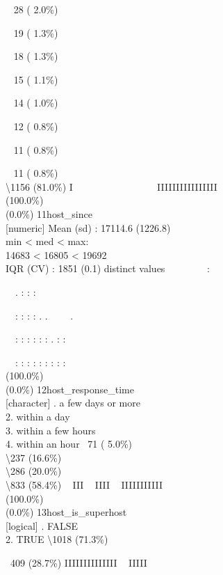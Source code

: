 \documentclass[
  journal,
]{IEEEtran}%
\begin{document}
\strut ~ 28 ( 2.0\%)\\
\strut ~ 19 ( 1.3\%)\\
\strut ~ 18 ( 1.3\%)\\
\strut ~ 15 ( 1.1\%)\\
\strut ~ 14 ( 1.0\%)\\
\strut ~ 12 ( 0.8\%)\\
\strut ~ 11 ( 0.8\%)\\
\strut ~ 11 ( 0.8\%)\\
\textbackslash1156 (81.0\%) \textbar{} \textbar I ~ ~ ~ ~ ~ ~ ~ ~ ~ ~
IIIIIIIIIIIIIIII \\
(100.0\%) \\
(0.0\%) \textbar{} \textbar{} 11\textbar host\_since\\
{[}numeric{]} \textbar Mean (sd) : 17114.6 (1226.8)\\
min \textless{} med \textless{} max:\\
14683 \textless{} 16805 \textless{} 19692\\
IQR (CV) : 1851 (0.1)  distinct values \textbar{}
\textbar~~~~~~~~:\\
\strut ~~. : : :\\
\strut ~~: : : : . . ~~~~.\\
\strut ~~: : : : : : . : :\\
\strut ~~: : : : : : : : : \\
(100.0\%) \\
(0.0\%) \textbar{} \textbar{} 12\textbar host\_response\_time\\
{[}character{]} . a few days or more\\
2. within a day\\
3. within a few hours\\
4. within an hour \textbar~71 ( 5.0\%)\\
\textbackslash237 (16.6\%)\\
\textbackslash286 (20.0\%)\\
\textbackslash833 (58.4\%) \textbar{} \textbar~ III ~ IIII ~ IIIIIIIIIII
\\
(100.0\%) \\
(0.0\%) \textbar{} \textbar{} 13\textbar host\_is\_superhost\\
{[}logical{]} . FALSE\\
2. TRUE \textbar\textbackslash1018 (71.3\%)\\
\strut ~409 (28.7\%) \textbar{} \textbar IIIIIIIIIIIIII ~ IIIII
\\
\end{document}
